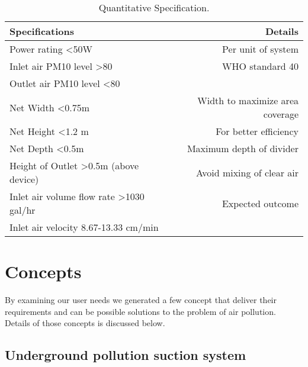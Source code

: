 \documentclass[12pt]{article}
\begin{document}
\begin{table}[!htb]
\centering

\hspace{5em} 
\begin{tabular}{l|r}

Specifications  & Details \\ \hline

Power rating \textless 50W & Per unit of system \\ 

Inlet air PM10 level \textgreater 80 & WHO standard 40 \\

Outlet air PM10 level \textless 80 & \\

Net Width \textless 0.75m & Width to maximize area coverage \\

Net Height \textless 1.2 m & For better efficiency \\

Net Depth \textless 0.5m & Maximum depth of divider \\

Height of Outlet \textgreater 0.5m (above device) &  Avoid mixing of clear air \\

Inlet air volume flow rate \textgreater  1030 gal/hr & Expected outcome \\

Inlet air velocity 8.67-13.33 cm/min & \\
\end{tabular}
\caption{\label{tab:widgets}Quantitative Specification.}
\end{table}
\vspace*{10mm}

\newpage

\section{Concepts}

By examining our user needs we generated a few concept that deliver their requirements and can be possible solutions to the problem of air pollution. Details of those concepts is discussed below.

\subsection{Underground pollution suction system}
\end{document}
